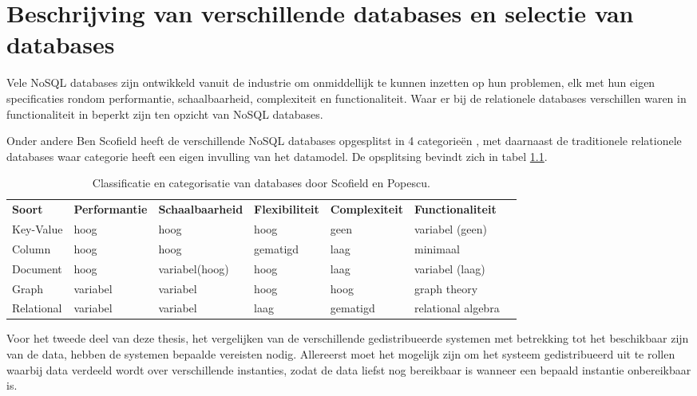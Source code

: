 \chapter{Beschrijving van verschillende databases en selectie van databases}
Vele NoSQL databases zijn ontwikkeld vanuit de industrie om onmiddellijk te kunnen inzetten op hun problemen, elk met hun eigen specificaties rondom performantie, schaalbaarheid, complexiteit en functionaliteit. Waar er bij de relationele databases verschillen waren in functionaliteit in beperkt zijn ten opzicht van NoSQL databases. 

Onder andere Ben Scofield\cite{Strauch.NoSQL} heeft de verschillende NoSQL databases opgesplitst in 4 categorieën , met daarnaast de traditionele relationele databases waar categorie heeft een eigen invulling van het datamodel. De opsplitsing bevindt zich in tabel \ref{table:selectie-classificatie}.
\begin{table}[!h]
	\resizebox{\textwidth}{!} {
		\begin{tabular}{l l l l l l l}
			\textbf{Soort} & \textbf{Performantie} & \textbf{Schaalbaarheid} & 			\textbf{Flexibiliteit} & \textbf{Complexiteit} & \textbf{Functionaliteit} \\
			Key-Value & hoog & hoog & hoog & geen & variabel (geen) \\
			Column & hoog & hoog & gematigd & laag & minimaal \\
			Document & hoog & variabel(hoog) & hoog & laag & variabel (laag) \\
			Graph & variabel & variabel & hoog & hoog & graph theory \\
			Relational & variabel & variabel & laag & gematigd & relational algebra \\
		\end{tabular}
	}
	
	\caption{Classificatie en categorisatie van databases door Scofield en Popescu. \cite{categorizatie-sco10} \cite{categorizatie-pop10b} }
	\label{table:selectie-classificatie}
\end{table}

Voor het tweede deel van deze thesis, het vergelijken van de verschillende gedistribueerde systemen met betrekking tot het beschikbaar zijn van de data, hebben de systemen bepaalde vereisten nodig. Allereerst moet het mogelijk zijn om het systeem gedistribueerd uit te rollen waarbij data verdeeld wordt over verschillende instanties, zodat de data liefst nog bereikbaar is wanneer een bepaald instantie onbereikbaar is. 

